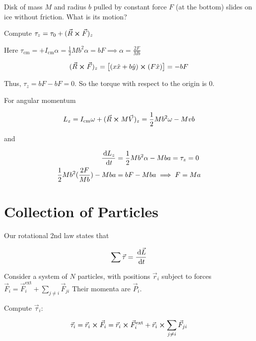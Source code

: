 \begin{example}
	Disk of mass $M$ and radius $b$ pulled by constant force $F$ (at the bottom) slides on ice without friction. What is its motion?
\end{example}

\begin{sol}
	Compute $\tau_z = \tau_0 + (\vec R \cross \vec F)_z$

	Here $\tau_\mathrm{cm} = + I_\mathrm{cm} \alpha  = \frac{1}{2} Mb^2 \alpha = bF \implies \alpha = \frac{2F}{Mb}$

	\begin{equation}
		(\vec R \cross \vec F)_z = \left[(x \hat x + b \hat y) \cross (F \hat x)\right] = -bF
	\end{equation}

	Thus, $\tau_z = bF - bF = 0$. So the torque with respect to the origin is 0.

	For angular momentum

	\begin{equation}
		L_z = I_\mathrm{cm} \omega + (\vec R \cross M \vec V)_z = \frac{1}{2} Mb^2 \omega - Mvb
	\end{equation}

	and

	\begin{align}
		\frac{\D L_z}{\D t} &= \frac{1}{2} Mb^2 \alpha - Mba = \tau_z = 0\\
		\frac{1}{2} Mb^2 (\frac{2F}{Mb}) - Mba &= bF - Mba \implies F = Ma
	\end{align}
\end{sol}

\section{Collection of Particles}

Our rotational 2nd law states that

\begin{equation}
	\sum \vec \tau = \frac{\D \vec L}{\D t}
\end{equation}

Consider a system of $N$ particles, with positions $\vec r_i$ subject to forces $\vec F_i = \vec F_i^\mathrm{ext} + \sum_{j\neq i} \vec F_{ji}$ Their momenta are $\vec P_i$.

Compute $\vec\tau_i$:

\begin{equation}
	\vec\tau_i = \vec r_i \cross \vec F_i = \vec r_i \cross \vec F_i^\mathrm{ext} + \vec r_i \cross \sum_{j\neq i} \vec F_{ji}
\end{equation}

